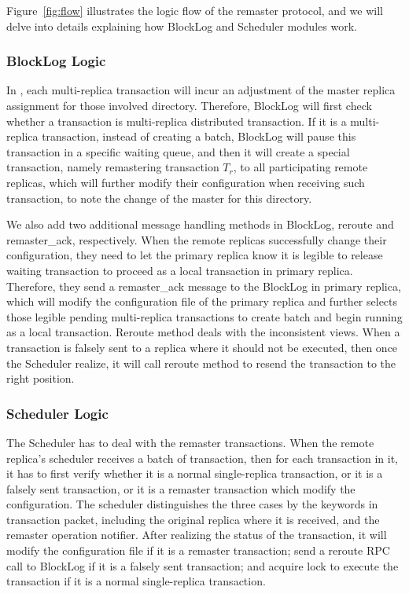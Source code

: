 Figure~\ref{fig:flow} illustrates the logic flow of the remaster protocol, and we will delve into details explaining how BlockLog and Scheduler modules work.

\subsubsection{BlockLog Logic}
In \name{}, each multi-replica transaction will incur an adjustment of the master replica assignment for those involved directory. Therefore, BlockLog will first check whether a transaction is multi-replica distributed transaction. If it is a multi-replica transaction, instead of creating a batch, BlockLog will pause this transaction in a specific waiting queue, and then it will create a special transaction, namely remastering transaction $T_r$, to all participating remote replicas, which will further modify their configuration when receiving such transaction, to note the change of the master for this directory.

We also add two additional message handling methods in BlockLog, reroute and remaster\_ack, respectively. When the remote replicas successfully change their configuration, they need to let the primary replica know it is legible to release waiting transaction to proceed as a local transaction in primary replica. Therefore, they send a remaster\_ack message to the BlockLog in primary replica, which will modify the configuration file of the primary replica and further selects those legible pending multi-replica transactions to create batch and begin running as a local transaction. Reroute method deals with the inconsistent views. When a transaction is falsely sent to a replica where it should not be executed, then once the Scheduler realize, it will call reroute method to resend the transaction to the right position.

\subsubsection{Scheduler Logic}
The Scheduler has to deal with the remaster transactions. When the remote replica's scheduler receives a batch of transaction, then for each transaction in it, it has to first verify whether it is a normal single-replica transaction, or it is a falsely sent transaction, or it is a remaster transaction which modify the configuration. The scheduler distinguishes the three cases by the keywords in transaction packet, including the original replica where it is received, and the remaster operation notifier. After realizing the status of the transaction, it will modify the configuration file if it is a remaster transaction; send a reroute RPC call to BlockLog if it is a falsely sent transaction; and acquire lock to execute the transaction if it is a normal single-replica transaction.








